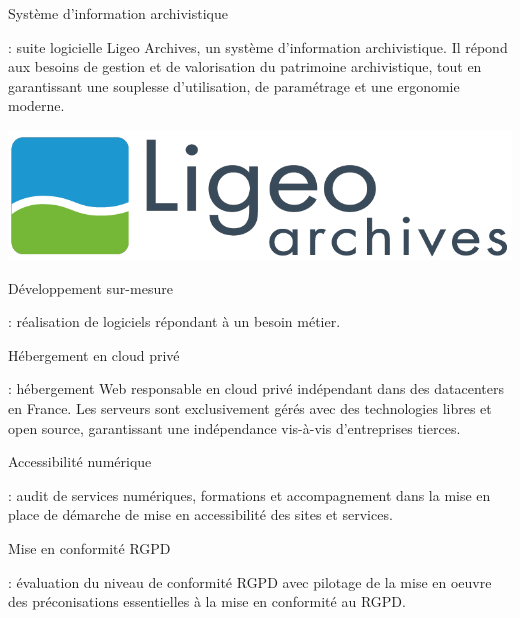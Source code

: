 \documentclass[12pt, a4paper, twoside]{article}
\begin{document}
\noindent%
\begin{minipage}{.7\textwidth}%

\begin{hilite}Système d'information archivistique\end{hilite}: suite logicielle Ligeo Archives, un système d'information archivistique. 
Il répond aux besoins de gestion et de valorisation du patrimoine archivistique, tout en garantissant une souplesse d'utilisation, de paramétrage et une ergonomie moderne.

\end{minipage}%
\hfill
\begin{minipage}{.3\textwidth}%
\begin{center}
    \includegraphics[scale=0.2]{src/logo_ligeo.png}
\end{center}
\end{minipage}%

\noindent%
\begin{hilite}Développement sur-mesure\end{hilite}: réalisation de logiciels répondant à un besoin métier.

\noindent%
\begin{hilite}Hébergement en cloud privé\end{hilite}: hébergement Web responsable en \gls{cloud privé} indépendant dans des datacenters en France. 
Les serveurs sont exclusivement gérés avec des technologies libres et open source, garantissant une indépendance vis-à-vis d'entreprises tierces.

\noindent%
\begin{hilite}Accessibilité numérique\end{hilite}: audit de services numériques, formations et accompagnement dans la mise en place de démarche de mise en accessibilité des sites et services.

\noindent%
\begin{hilite}Mise en conformité \gls{RGPD}\end{hilite}: évaluation du niveau de conformité \gls{RGPD} avec pilotage de la mise en oeuvre des préconisations essentielles à la mise en conformité au \gls{RGPD}.
\end{document}
